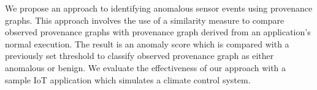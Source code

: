  
 
 \par We propose an approach to identifying anomalous sensor events using provenance graphs. This approach involves the use of a similarity measure to compare observed provenance graphs with provenance graph derived from an application's normal execution. The result is an anomaly score which is  compared with a previously set threshold to classify observed provenance graph as either anomalous or benign. We evaluate the effectiveness of our approach with a sample IoT application which simulates a climate control system.




